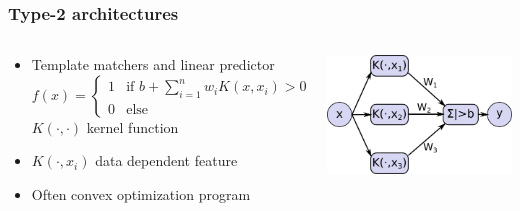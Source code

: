 \begin{frame}
	\frametitle{Type-2 architectures}
	\begin{columns}
		\begin{column}{6.5cm}
			\begin{itemize}
				\item Template matchers and linear predictor
				\begin{displaymath}
					f(x)= \begin{cases}
						1& \text{if } b + \sum_{i=1}^{n}w_i K(x,x_i) > 0\\
						0& \text{else}
					\end{cases}
				\end{displaymath}
				$K(\cdot,\cdot)$ kernel function
				\item $K(\cdot,x_i)$ data dependent feature
				\item Often convex optimization program
			\end{itemize}
		\end{column}
		\begin{column}{5cm}
			\includegraphics[width=5cm]{images/kernelMachine.png}
		\end{column}
	\end{columns}
\end{frame}

